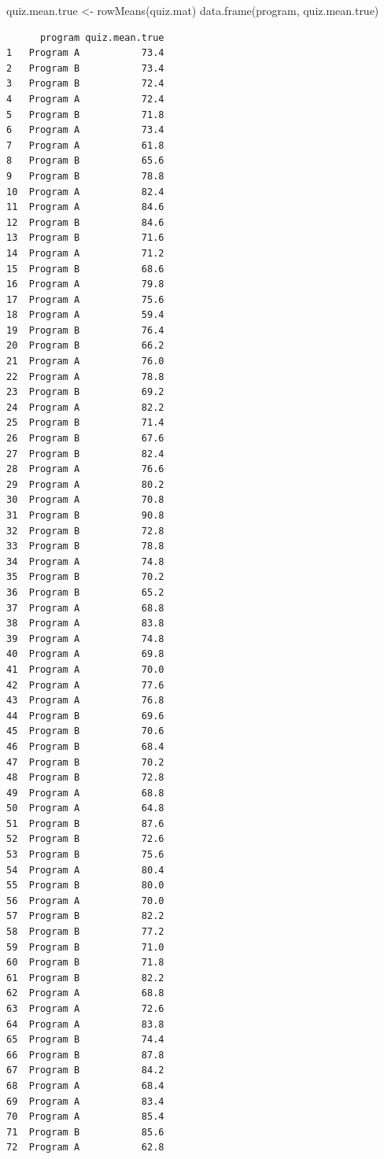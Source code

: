 \documentclass[
  letterpaper,
  DIV=11,
  numbers=noendperiod]{scrreprt}
\newenvironment{Shaded}{\begin{snugshade}}{\end{snugshade}}
\newcommand{\FunctionTok}[1]{\textcolor[rgb]{0.28,0.35,0.67}{#1}}
\newcommand{\NormalTok}[1]{\textcolor[rgb]{0.00,0.23,0.31}{#1}}
\newcommand{\OtherTok}[1]{\textcolor[rgb]{0.00,0.23,0.31}{#1}}
\begin{document}
\begin{Shaded}
\begin{Highlighting}[]
\NormalTok{quiz.mean.true }\OtherTok{\textless{}{-}} \FunctionTok{rowMeans}\NormalTok{(quiz.mat)}
\FunctionTok{data.frame}\NormalTok{(program, quiz.mean.true)}
\end{Highlighting}
\end{Shaded}

\begin{verbatim}
      program quiz.mean.true
1   Program A           73.4
2   Program B           73.4
3   Program B           72.4
4   Program A           72.4
5   Program B           71.8
6   Program A           73.4
7   Program A           61.8
8   Program B           65.6
9   Program B           78.8
10  Program A           82.4
11  Program A           84.6
12  Program B           84.6
13  Program B           71.6
14  Program A           71.2
15  Program B           68.6
16  Program A           79.8
17  Program A           75.6
18  Program A           59.4
19  Program B           76.4
20  Program B           66.2
21  Program A           76.0
22  Program A           78.8
23  Program B           69.2
24  Program A           82.2
25  Program B           71.4
26  Program B           67.6
27  Program B           82.4
28  Program A           76.6
29  Program A           80.2
30  Program A           70.8
31  Program B           90.8
32  Program B           72.8
33  Program B           78.8
34  Program A           74.8
35  Program B           70.2
36  Program B           65.2
37  Program A           68.8
38  Program A           83.8
39  Program A           74.8
40  Program A           69.8
41  Program A           70.0
42  Program A           77.6
43  Program A           76.8
44  Program B           69.6
45  Program B           70.6
46  Program B           68.4
47  Program B           70.2
48  Program B           72.8
49  Program A           68.8
50  Program A           64.8
51  Program B           87.6
52  Program B           72.6
53  Program B           75.6
54  Program A           80.4
55  Program B           80.0
56  Program A           70.0
57  Program B           82.2
58  Program B           77.2
59  Program B           71.0
60  Program B           71.8
61  Program B           82.2
62  Program A           68.8
63  Program A           72.6
64  Program A           83.8
65  Program B           74.4
66  Program B           87.8
67  Program B           84.2
68  Program A           68.4
69  Program A           83.4
70  Program A           85.4
71  Program B           85.6
72  Program A           62.8

\end{verbatim}
\end{document}
